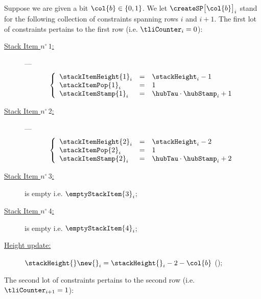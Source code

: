 


Suppose we are given a bit $\col{b} \in \{ 0, 1\}$. We let $\createSP\big[\col{b}\big]_{i}$ stand for the following collection of constraints spanning rows $i$ and $i+1$.
The first lot of constraints pertains to the first row (i.e. $\tliCounter_{i} = 0$):
\begin{description}
	\item[\underline{Stack Item $n^\circ\,1$:}] ---
	\[
	\left\{
	\begin{array}{lcl}
		\stackItemHeight{1}_{i}	& = & \stackHeight_{i} - 1 \\
		\stackItemPop{1}_{i}	& = & 1 \\
		\stackItemStamp{1}_{i}	& = & \hubTau \cdot \hubStamp_{i} + 1 \\
	\end{array}
	\right.
	\]
	\item[\underline{Stack Item $n^\circ\,2$:}] ---
	\[
	\left\{
	\begin{array}{lcl}
		\stackItemHeight{2}_{i}	& = & \stackHeight_{i} - 2 \\
		\stackItemPop{2}_{i}	& = & 1 \\
		\stackItemStamp{2}_{i}	& = & \hubTau \cdot \hubStamp_{i} + 2 \\
	\end{array}
	\right.
	\]
	\item[\underline{Stack Item $n^\circ\,3$:}] is empty i.e. $\emptyStackItem{3}_{i}$;
	\item[\underline{Stack Item $n^\circ\,4$:}] is empty i.e. $\emptyStackItem{4}_{i}$;
	\item[\underline{Height update:}] $\stackHeight{}\new{}_{i} = \stackHeight{}_{i} - 2 - \col{b}$ \quad (\sanityCheck);
\end{description}
The second lot of constraints pertains to the second row (i.e. $\tliCounter_{i + 1} = 1$):
